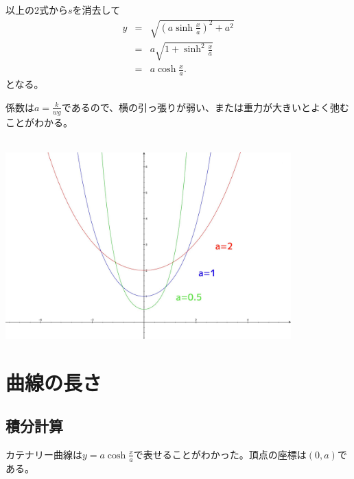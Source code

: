 以上の2式から$s$を消去して
\begin{eqnarray*}
y & = & \sqrt{\left(a\sinh \frac{x}{a}\right)^2 + a^2}　\\
& = & a\sqrt{1 + \sinh^2 \frac{x}{a}} \\
& = & a\cosh{\frac{x}{a}}.
\end{eqnarray*}
となる。\par
係数は$a = \frac{k}{wg}$であるので、横の引っ張りが弱い、または重力が大きいとよく弛むことがわかる。\\\\

\begin{center}
  \includegraphics[width = 11cm]{nakayama/image/catenary1.JPG}
\end{center}


\newpage
\section{曲線の長さ}
\subsection{積分計算}

カテナリー曲線は$y = a\cosh{\frac{x}{a}}$で表せることがわかった。頂点の座標は$(0,a)$である。

